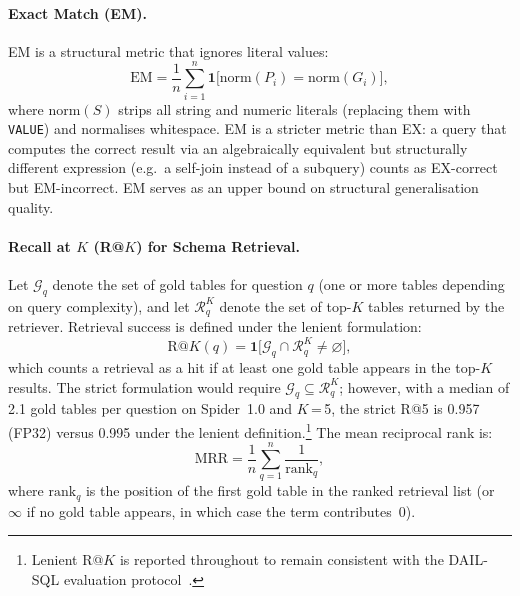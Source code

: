 \paragraph{Exact Match (EM).}
EM is a structural metric that ignores literal values:
\begin{equation}
  \mathrm{EM} = \frac{1}{n}\sum_{i=1}^{n}
  \mathbf{1}\bigl[\text{norm}(P_i) = \text{norm}(G_i)\bigr],
\end{equation}
where $\text{norm}(S)$ strips all string and numeric literals
(replacing them with \texttt{VALUE}) and normalises whitespace.
EM is a stricter metric than EX: a query that computes the
correct result via an algebraically equivalent but structurally
different expression (e.g.\ a self-join instead of a subquery)
counts as EX-correct but EM-incorrect.
EM serves as an upper bound on structural generalisation quality.

\paragraph{Recall at $K$ (R@$K$) for Schema Retrieval.}
Let $\mathcal{G}_q$ denote the set of gold tables for question $q$
(one or more tables depending on query complexity), and let
$\mathcal{R}_q^K$ denote the set of top-$K$ tables returned by the
retriever.
Retrieval success is defined under the lenient formulation:
\begin{equation}
  \mathrm{R@}K(q) = \mathbf{1}\bigl[
    \mathcal{G}_q \cap \mathcal{R}_q^K \neq \varnothing
  \bigr],
  \label{eq:rk}
\end{equation}
which counts a retrieval as a hit if at least one gold table appears
in the top-$K$ results.
The strict formulation would require $\mathcal{G}_q \subseteq \mathcal{R}_q^K$;
however, with a median of 2.1 gold tables per question on Spider~1.0
and $K$\,=\,5, the strict R@5 is 0.957 (FP32) versus 0.995 under the
lenient definition.\footnote{Lenient R@$K$ is reported throughout to remain
consistent with the DAIL-SQL evaluation protocol~\citep{gao2023dailsql}.}
The mean reciprocal rank is:
\begin{equation}
  \mathrm{MRR} = \frac{1}{n}\sum_{q=1}^{n}\frac{1}{\text{rank}_q},
  \label{eq:mrr}
\end{equation}
where $\text{rank}_q$ is the position of the first gold table in the
ranked retrieval list (or $\infty$ if no gold table appears, in which
case the term contributes~0).

